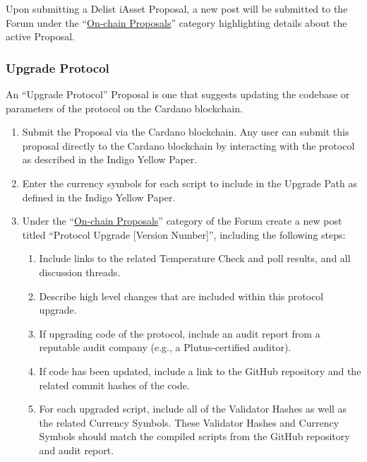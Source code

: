 Upon submitting a Delist iAsset Proposal, a new post will be submitted
to the Forum under the
``\href{https://forum.indigoprotocol.io/c/proposals/6}{On-chain
Proposals}'' category highlighting details about the active Proposal.

\hypertarget{upgrade-protocol}{%
\subsubsection{Upgrade Protocol}\label{upgrade-protocol}}

An ``Upgrade Protocol'' Proposal is one that suggests updating the
codebase or parameters of the protocol on the Cardano blockchain.

\begin{enumerate}
\item
  Submit the Proposal via the Cardano blockchain. Any user can submit
  this proposal directly to the Cardano blockchain by interacting with
  the protocol as described in the Indigo Yellow Paper.
\item
  Enter the currency symbols for each script to include in the Upgrade
  Path as defined in the Indigo Yellow Paper.
\item
  Under the
  ``\href{https://forum.indigoprotocol.io/c/proposals/6}{On-chain
  Proposals}'' category of the Forum create a new post titled ``Protocol
  Upgrade {{[}}Version Number{{]}}'', including the following steps:

  \begin{enumerate}
  \item
    Include links to the related Temperature Check and poll results, and
    all discussion threads.
  \item
    Describe high level changes that are included within this protocol
    upgrade.
  \item
    If upgrading code of the protocol, include an audit report from a
    reputable audit company (e.g., a Plutus-certified auditor).
  \item
    If code has been updated, include a link to the GitHub repository
    and the related commit hashes of the code.
  \item
    For each upgraded script, include all of the Validator Hashes as
    well as the related Currency Symbols. These Validator Hashes and
    Currency Symbols should match the compiled scripts from the GitHub
    repository and audit report.
  \end{enumerate}
\end{enumerate}

